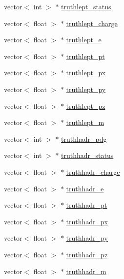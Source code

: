 \begin{DoxyCompactItemize}
vector$<$ int $>$ $\ast$ \hyperlink{classCollectionTree_a4af45f0cf4b3ff06e496bb86660a9cd1}{truthlept\+\_\+status}
\item 
vector$<$ float $>$ $\ast$ \hyperlink{classCollectionTree_a5c73a1250f9acd788407874a697318dd}{truthlept\+\_\+charge}
\item 
vector$<$ float $>$ $\ast$ \hyperlink{classCollectionTree_aca079cc29c783ea411951f2a0d594ba4}{truthlept\+\_\+e}
\item 
vector$<$ float $>$ $\ast$ \hyperlink{classCollectionTree_a8beb8c3b8c0ccc42e84806fefd29848b}{truthlept\+\_\+pt}
\item 
vector$<$ float $>$ $\ast$ \hyperlink{classCollectionTree_a27e993d0313e545f09a5945987e95454}{truthlept\+\_\+px}
\item 
vector$<$ float $>$ $\ast$ \hyperlink{classCollectionTree_adcb1fdff825c0d9a3e74712a8da7a6e0}{truthlept\+\_\+py}
\item 
vector$<$ float $>$ $\ast$ \hyperlink{classCollectionTree_a67927ef366346003ded0b1692e2dab07}{truthlept\+\_\+pz}
\item 
vector$<$ float $>$ $\ast$ \hyperlink{classCollectionTree_abb87a7a5ebcaaef9f5325c0e3940b5e3}{truthlept\+\_\+m}
\item 
vector$<$ int $>$ $\ast$ \hyperlink{classCollectionTree_ac07037e0c0831671f7ab70a537fd2291}{truthhadr\+\_\+pdg}
\item 
vector$<$ int $>$ $\ast$ \hyperlink{classCollectionTree_a0f38ddf72beb678321afe75811e9282e}{truthhadr\+\_\+status}
\item 
vector$<$ float $>$ $\ast$ \hyperlink{classCollectionTree_a4219532734a7d10053b7f239dbf8a9a7}{truthhadr\+\_\+charge}
\item 
vector$<$ float $>$ $\ast$ \hyperlink{classCollectionTree_a22fc83741dc0a827a14764f8ea22a277}{truthhadr\+\_\+e}
\item 
vector$<$ float $>$ $\ast$ \hyperlink{classCollectionTree_a14d4f718e282342d9d956ee0a153e3de}{truthhadr\+\_\+pt}
\item 
vector$<$ float $>$ $\ast$ \hyperlink{classCollectionTree_aceb15b5918ff7c91941bd2e2039a8a7f}{truthhadr\+\_\+px}
\item 
vector$<$ float $>$ $\ast$ \hyperlink{classCollectionTree_ae91ab283f9a522af7944862b74851de4}{truthhadr\+\_\+py}
\item 
vector$<$ float $>$ $\ast$ \hyperlink{classCollectionTree_a9eb11595f2674b02cbf00fbf42ddcbb0}{truthhadr\+\_\+pz}
\item 
vector$<$ float $>$ $\ast$ \hyperlink{classCollectionTree_ad21267e1ef7fd80a2adb44d2e857d3cd}{truthhadr\+\_\+m}

\end{DoxyCompactItemize}
